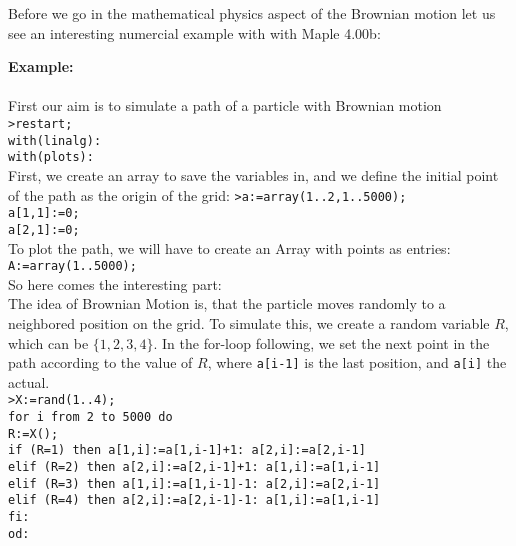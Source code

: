 	Before we go in the mathematical physics aspect of the Brownian motion let us see an interesting numercial example with with Maple 4.00b:
	\begin{tcolorbox}[colframe=black,colback=white,sharp corners]
	\textbf{{\Large {}}Example:}\\\\
	First our aim is to simulate a path of a particle with Brownian motion\\

	\texttt{>restart;\\
    with(linalg):\\
    with(plots):}\\
    
	First, we create an array to save the variables in, and we define the initial point of the path as the origin of the grid:
	\texttt{>a:=array(1..2,1..5000);\\
    a[1,1]:=0;\\
    a[2,1]:=0;}\\
    
    To plot the path, we will have to create an Array with points as entries:\\
   \texttt{A:=array(1..5000);}\\
    
    So here comes the interesting part:\\

	The idea of Brownian Motion is, that the particle moves randomly to a neighbored position on the grid. To simulate this, we create a random variable $R$, which can be $\{1,2,3,4\}$. In the for-loop following, we set the next point in the path according to the value of $R$, where \texttt{a[i-1]} is the last position, and \texttt{a[i]} the actual.\\
	
	\texttt{>X:=rand(1..4);\\
    for i from 2 to 5000 do\\
      R:=X();\\
      if (R=1) then a[1,i]:=a[1,i-1]+1: a[2,i]:=a[2,i-1]\\
        elif (R=2) then a[2,i]:=a[2,i-1]+1: a[1,i]:=a[1,i-1]\\
        elif (R=3) then a[1,i]:=a[1,i-1]-1: a[2,i]:=a[2,i-1]\\
        elif (R=4) then a[2,i]:=a[2,i-1]-1: a[1,i]:=a[1,i-1]\\
     fi:\\
    od:}\\
    

\end{tcolorbox}

